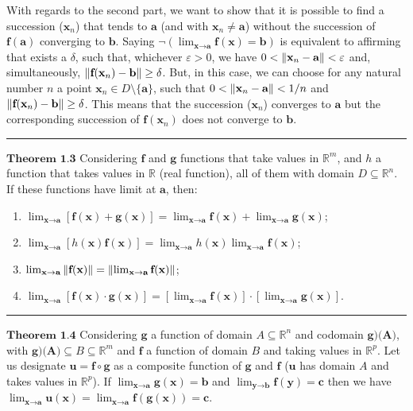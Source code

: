 \documentclass[0pt, a4paper]{article}
\begin{document}
With regards to the second part, we want to show that it is possible to find a succession ($\textbf{x}_n$) that tends to $\textbf{a}$ (and with $\textbf{x}_n \neq \textbf{a}$) without the succession of $\textbf{f}(\textbf{a})$ converging to $\textbf{b}$. Saying $\lnot (\lim_{\textbf{x}\to \textbf{a}} \textbf{f}(\textbf{x})=\textbf{b})$ is equivalent to affirming that exists a $\delta$, such that, whichever $\varepsilon>0$, we have $0<\norm{\textbf{x}_n-\textbf{a}}<\varepsilon$ and, simultaneously, $\norm{\textbf{f}(\textbf{x}_n)-\textbf{b}}\geq \delta$. But, in this case, we can choose for any natural number $n$ a point $\textbf{x}_n\in D\setminus\{\textbf{a}\}$, such that $0<\norm{\textbf{x}_n-\textbf{a}}<1/n$ and $\norm{\textbf{f}(\textbf{x}_n)-\textbf{b}}\geq \delta$. This means that the succession ($\textbf{x}_n$) converges to $\textbf{a}$ but the corresponding succession of $\textbf{f}(\textbf{x}_n)$ does not converge to $\textbf{b}$.

\noindent\rule{\textwidth}{1pt}

$\textbf{Theorem 1.3}$ Considering $\textbf{f}$ and $\textbf{g}$ functions that take values in $\mathbb{R}^m$, and $h$ a function that takes values in $\mathbb{R}$ (real function), all of them with domain $D \subseteq \mathbb{R}^n$. If these functions have limit at $\textbf{a}$, then:
\begin{enumerate}
	\item $\lim_{\textbf{x}\to\textbf{a}} [\textbf{f}(\textbf{x})+\textbf{g}(\textbf{x})] = \lim_{\textbf{x}\to\textbf{a}} \textbf{f}(\textbf{x}) + \lim_{\textbf{x}\to\textbf{a}} \textbf{g}(\textbf{x})$;
	\item $\lim_{\textbf{x}\to\textbf{a}} [h(\textbf{x})\textbf{f}(\textbf{x})] = \lim_{\textbf{x}\to\textbf{a}} h(\textbf{x}) \lim_{\textbf{x}\to\textbf{a}} \textbf{f}(\textbf{x})$;
	\item $\lim_{\textbf{x}\to\textbf{a}} \norm{\textbf{f}(\textbf{x})} = \norm{\lim_{\textbf{x}\to\textbf{a}} \textbf{f}(\textbf{x})}$;
	\item $\lim_{\textbf{x}\to\textbf{a}}[\textbf{f}(\textbf{x})\cdot\textbf{g}(\textbf{x})]=[\lim_{\textbf{x}\to\textbf{a}} \textbf{f}(\textbf{x})]\cdot [\lim_{\textbf{x}\to\textbf{a}} \textbf{g}(\textbf{x})]$.
\end{enumerate}	

\noindent\rule{\textwidth}{1pt}

$\textbf{Theorem 1.4}$ Considering $\textbf{g}$ a function of domain $A \subseteq \mathbb{R}^n$ and codomain  $\textbf{g)(A)}$, with $\textbf{g)(A)} \subseteq B \subseteq \mathbb{R}^m$ and $\textbf{f}$ a function of domain $B$ and taking values in $\mathbb{R}^p$. Let us designate $\textbf{u}=\textbf{f} \circ \textbf{g} $ as a composite function of $\textbf{g}$ and $\textbf{f}$ ($\textbf{u}$ has domain $A$ and takes values in $\mathbb{R}^p$). If $\lim_{\textbf{x}\to\textbf{a}} \textbf{g}(\textbf{x})=\textbf{b}$ and $\lim_{\textbf{y}\to\textbf{b}} \textbf{f}(\textbf{y})=\textbf{c}$ then we have $\lim_{\textbf{x}\to\textbf{a}} \textbf{u}(\textbf{x})=\lim_{\textbf{x}\to\textbf{a}} \textbf{f}(\textbf{g}(\textbf{x}))=\textbf{c}$.
\end{document}
